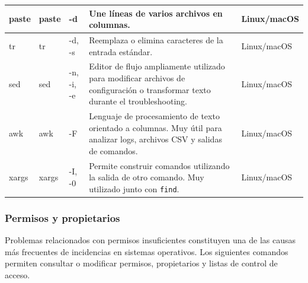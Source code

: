 \documentclass[a4paper,10pt]{article}
\begin{document}
\begin{longtable}{|p{2.8cm}|p{3cm}|p{4cm}|p{5.6cm}|p{1.5cm}|}
paste &
paste &
-d &
Une líneas de varios archivos en columnas. &
Linux/macOS
\\
\hline

tr &
tr &
-d, -s &
Reemplaza o elimina caracteres de la entrada estándar. &
Linux/macOS
\\
\hline

sed &
sed &
-n, -i, -e &
Editor de flujo ampliamente utilizado para modificar archivos de configuración o transformar texto durante el troubleshooting. &
Linux/macOS
\\
\hline

awk &
awk &
-F &
Lenguaje de procesamiento de texto orientado a columnas. Muy útil para analizar logs, archivos CSV y salidas de comandos. &
Linux/macOS
\\
\hline

xargs &
xargs &
-I, -0 &
Permite construir comandos utilizando la salida de otro comando. Muy utilizado junto con \texttt{find}. &
Linux/macOS
\\
\hline

\end{longtable}


\subsubsection{Permisos y propietarios}

Problemas relacionados con permisos insuficientes constituyen una de las causas
más frecuentes de incidencias en sistemas operativos. Los siguientes comandos
permiten consultar o modificar permisos, propietarios y listas de control de acceso.
\end{document}
